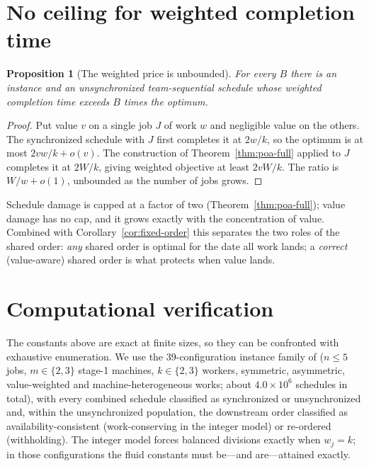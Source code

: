 \documentclass[sn-mathphys,NameDate]{sn-jnl}
\theoremstyle{thmstyleone}
\newtheorem{proposition}[theorem]{Proposition}
\theoremstyle{thmstylethree}
\theoremstyle{thmstyletwo}
\begin{document}
\section{No ceiling for weighted completion time}
\label{sec:wct}

\begin{proposition}[The weighted price is unbounded]
\label{prop:wct}
For every $B$ there is an instance and an unsynchronized
team-sequential schedule whose weighted completion time exceeds $B$
times the optimum.
\end{proposition}

\begin{proof}
Put value $v$ on a single job $J$ of work $w$ and negligible value
on the others. The synchronized schedule with $J$ first completes
it at $2w/k$, so the optimum is at most
$2vw/k + o(v)$. The construction of Theorem~\ref{thm:poa-full}
applied to $J$ completes it at $2W/k$, giving weighted objective at
least $2vW/k$. The ratio is $W/w + o(1)$, unbounded as the number
of jobs grows.
\end{proof}

Schedule damage is capped at a factor of two
(Theorem~\ref{thm:poa-full}); value damage has no cap, and it grows
exactly with the concentration of value. Combined with
Corollary~\ref{cor:fixed-order} this separates the two roles of the
shared order: \emph{any} shared order is optimal for the date all
work lands; a \emph{correct} (value-aware) shared order is what
protects when value lands.

\section{Computational verification}
\label{sec:verification}

The constants above are exact at finite sizes, so they can be
confronted with exhaustive enumeration. We use the
39-configuration instance family of \citet{bowmanA}
($n \le 5$ jobs, $m \in \{2,3\}$ stage-1 machines,
$k \in \{2,3\}$ workers, symmetric, asymmetric, value-weighted and
machine-heterogeneous works; about $4.0 \times 10^{6}$ schedules in
total), with every combined schedule classified as synchronized or
unsynchronized and, within the unsynchronized population, the
downstream order classified as availability-consistent
(work-conserving in the integer model) or re-ordered (withholding).
The integer model forces balanced divisions exactly when $w_j = k$;
in those configurations the fluid constants must be---and
are---attained exactly.
\end{document}

